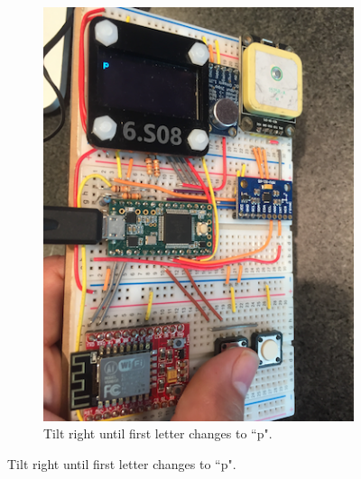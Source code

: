 \documentclass[12pt]{article}
\begin{document}
\begin{figure}
\begin{subfigure}[b]{.3\linewidth}
\includegraphics[width=\linewidth]{text-p}
\caption{Tilt right until first letter changes to ``p".}
\label{fig:text-p}
\end{subfigure}


\end{figure}
\end{document}
